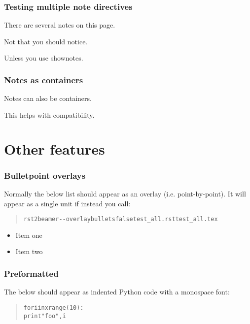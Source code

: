 \documentclass[t]{beamer}
\begin{document}
\begin{frame}[fragile]
\frametitle{Testing multiple note directives}


There are several notes on this page.

Not that you should notice.

Unless you use \textquotedbl{}shownotes\textquotedbl{}.

\end{frame}

\begin{frame}[fragile]
\frametitle{Notes as containers}


Notes can also be containers.

This helps with compatibility.

\end{frame}


\section{Other features%
  \label{other-features}%
}

\begin{frame}[fragile]
\frametitle{Bulletpoint overlays}


Normally the below list should appear as an overlay (i.e. point-by-point). It
will appear as a single unit if instead you call:
%
\begin{quote}
\begin{alltt}
rst2beamer -{}-overlaybullets false test_all.rst test_all.tex
\end{alltt}
\end{quote}
\begin{itemize}[<+-| alert@+>]

\item Item one

\item Item two
\end{itemize}

\end{frame}

\begin{frame}[fragile]
\frametitle{Preformatted}


The below should appear as indented Python code with a monospace font:
%
\begin{quote}
\begin{alltt}
for i in xrange (10):
        print "foo", i
\end{alltt}
\end{quote}

\end{frame}
\end{document}

